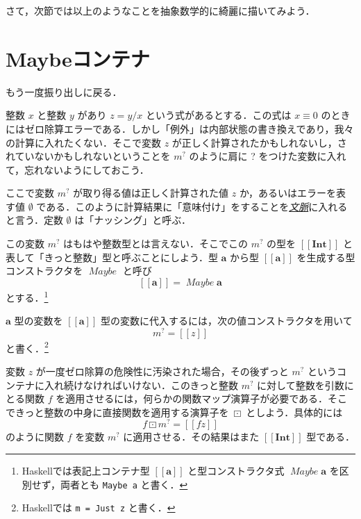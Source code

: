 \documentclass[a4paper,draft]{jsbook}
\def\[{\left[\!\left[}
\def\]{\right]\!\right]}
\newcommand{\programminglanguage}[1]{\textsf{#1}}
\newcommand{\haskell}{\programminglanguage{Haskell}}
\newcommand{\keyword}[1]{{\underline{\emph{#1}}}}
\newcommand{\code}[1]{\texttt{#1}}
\newcommand{\mType}[1]{\mathbf{#1}}
\newcommand{\mIntType}{\mType{Int}}
\newcommand{\mMaybeType}[1]{\[\mType{#1}\]}
\newcommand{\mTypeConstructor}[1]{\mathit{#1}} %
\newcommand{\mNothing}{\emptyset}
\newcommand{\mMaybeOf}[1]{\[#1\]}
\newcommand{\mMaybeVar}[1]{{#1}^\text{?}}
\DeclareMathOperator{\mMapMaybe}{\boxdot}
\DeclareMathOperator{\mMaybeTypeConstructor}{\mTypeConstructor{Maybe}}
\begin{document}
さて，次節では以上のようなことを抽象数学的に綺麗に描いてみよう．

\section{Maybeコンテナ}

もう一度振り出しに戻る．

整数 $x$ と整数 $y$ があり $z=y/x$ という式があるとする．この式は $x\equiv0$ のときにはゼロ除算エラーである．しかし「例外」は内部状態の書き換えであり，我々の計算に入れたくない．そこで変数 $z$ が正しく計算されたかもしれないし，されていないかもしれないということを $\mMaybeVar{m}$ のように肩に ? をつけた変数に入れて，忘れないようにしておこう．

ここで変数 $\mMaybeVar{m}$ が取り得る値は正しく計算された値 $z$ か，あるいはエラーを表す値 $\mNothing$ である．このように計算結果に「意味付け」をすることを\keyword{文脈}に入れると言う．定数 $\mNothing$ は「ナッシング」と呼ぶ．

この変数 $\mMaybeVar{m}$ はもはや整数型とは言えない．そこでこの $\mMaybeVar{m}$ の型を $\mMaybeType{\mIntType}$ と表して「きっと整数」型と呼ぶことにしよう．型 $\mType{a}$ から型 $\mMaybeType{a}$ を生成する型コンストラクタを $\mMaybeTypeConstructor$ と呼び
\begin{equation}
\mMaybeType{a}=\mMaybeTypeConstructor\mType{a}
\end{equation}
とする．\footnote{\haskell では表記上コンテナ型 $\mMaybeType{a}$ と型コンストラクタ式 $\mMaybeTypeConstructor\mType{a}$ を区別せず，両者とも \code{Maybe a} と書く．}

$\mType{a}$ 型の変数を $\mMaybeType{a}$ 型の変数に代入するには，次の値コンストラクタを用いて
\begin{equation}
\mMaybeVar{m}=\mMaybeOf{z}
\end{equation}
と書く．\footnote{\haskell では \code{m = Just z} と書く．}

変数 $z$ が一度ゼロ除算の危険性に汚染された場合，その後ずっと $\mMaybeVar{m}$ というコンテナに入れ続けなければいけない．このきっと整数 $\mMaybeVar{m}$ に対して整数を引数にとる関数 $f$ を適用させるには，何らかの関数マップ演算子が必要である．そこできっと整数の中身に直接関数を適用する演算子を $\mMapMaybe$ としよう．具体的には
\begin{equation}
f\mMapMaybe\mMaybeVar{m}=\mMaybeOf{fz}
\end{equation}
のように関数 $f$ を変数 $\mMaybeVar{m}$ に適用させる．その結果はまた $\mMaybeType{Int}$ 型である．
\end{document}
